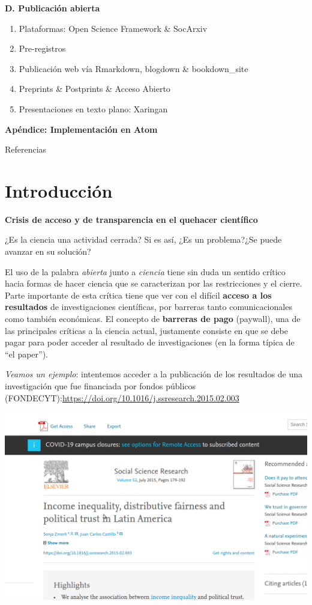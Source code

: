 \documentclass[
  11pt,
]{book}
\providecommand{\tightlist}{%
  \setlength{\itemsep}{0pt}\setlength{\parskip}{0pt}}
\begin{document}
\textbf{D. Publicación abierta}

\begin{enumerate}
\def\labelenumi{\arabic{enumi}.}
\setcounter{enumi}{8}
\tightlist
\item
  Plataformas: Open Science Framework \& SocArxiv
\item
  Pre-registros
\item
  Publicación web vía Rmarkdown, blogdown \& bookdown\_site
\item
  Preprints \& Postprints \& Acceso Abierto
\item
  Presentaciones en texto plano: Xaringan
\end{enumerate}

\textbf{Apéndice: Implementación en Atom}

Referencias

\hypertarget{introducciuxf3n}{%
\chapter*{Introducción}\label{introducciuxf3n}}

\textbf{Crisis de acceso y de transparencia en el quehacer científico}

¿Es la ciencia una actividad cerrada? Si es así, ¿Es un problema?¿Se puede avanzar en su solución?

El uso de la palabra \emph{abierta} junto a \emph{ciencia} tiene sin duda un sentido crítico hacia formas de hacer ciencia que se caracterizan por las restricciones y el cierre. Parte importante de esta crítica tiene que ver con el difícil \textbf{acceso a los resultados} de investigaciones científicas, por barreras tanto comunicacionales como también económicas. El concepto de \textbf{barreras de pago} (paywall), una de las principales críticas a la ciencia actual, justamente consiste en que se debe pagar para poder acceder al resultado de investigaciones (en la forma típica de ``el paper'').

\emph{Veamos un ejemplo}: intentemos acceder a la publicación de los resultados de una investigación que fue financiada por fondos públicos (FONDECYT):\url{https://doi.org/10.1016/j.ssresearch.2015.02.003}

\includegraphics{images/access.gif}
\end{document}
